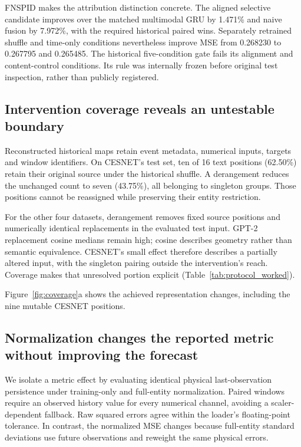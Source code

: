 \documentclass[preprint,11pt]{elsarticle}
\begin{document}
FNSPID makes the attribution distinction concrete. The aligned selective candidate improves over the matched multimodal GRU by 1.471\% and naive fusion by 7.972\%, with the required historical paired wins. Separately retrained shuffle and time-only conditions nevertheless improve MSE from 0.268230 to 0.267795 and 0.265485. The historical five-condition gate fails its alignment and content-control conditions. Its rule was internally frozen before original test inspection, rather than publicly registered.

\subsection{Intervention coverage reveals an untestable boundary}
\label{sec:coverage_results}

Reconstructed historical maps retain event metadata, numerical inputs, targets and window identifiers. On CESNET's test set, ten of 16 text positions (62.50\%) retain their original source under the historical shuffle. A derangement reduces the unchanged count to seven (43.75\%), all belonging to singleton groups. Those positions cannot be reassigned while preserving their entity restriction.

For the other four datasets, derangement removes fixed source positions and numerically identical replacements in the evaluated test input. GPT-2 replacement cosine medians remain high; cosine describes geometry rather than semantic equivalence. CESNET's small effect therefore describes a partially altered input, with the singleton pairing outside the intervention's reach. Coverage makes that unresolved portion explicit (Table~\ref{tab:protocol_worked}).

Figure~\ref{fig:coverage}a shows the achieved representation changes, including the nine mutable CESNET positions.

\subsection{Normalization changes the reported metric without improving the forecast}

We isolate a metric effect by evaluating identical physical last-observation persistence under training-only and full-entity normalization. Paired windows require an observed history value for every numerical channel, avoiding a scaler-dependent fallback. Raw squared errors agree within the loader's floating-point tolerance. In contrast, the normalized MSE changes because full-entity standard deviations use future observations and reweight the same physical errors.
\end{document}
